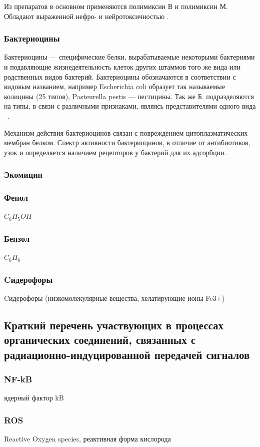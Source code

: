 \documentclass[11pt]{article}
\begin{document}
	Из препаратов в основном применяются полимиксин В и полимиксин М. Обладают выраженной нефро- и нейротоксичностью .
	
	
	\subsubsection{Бактериоцины}
Бактериоцины — специфические белки, вырабатываемые некоторыми бактериями и подавляющие жизнедеятельность клеток других штаммов того же вида или родственных видов бактерий. Бактериоцины обозначаются в соответствии с видовым названием, например Escherichia coli образует так называемые колицины (25 типов), Pasteurella pestis — пестицины. Так же Б. подразделяются на типы, в связи с различными признаками, являясь представителями одного вида ~\cite{BC_1}.

Механизм действия бактериоцинов связан с повреждением цитоплазматических мембран белком. Спектр активности бактериоцинов, в отличие от антибиотиков, узок и определяется наличием рецепторов у бактерий для их адсорбции.
	\subsubsection{Экомицин}
	
	\subsubsection{Фенол}
		$C_6H_5OH$
	\subsubsection{Бензол}
	$C_6H_6$
	\subsubsection{Cидерофоры}			
	Cидерофоры (низкомолекулярные вещества, хелатирующие ионы Fe3+) ~\cite{ecogen17119-32}

	\subsection{Краткий перечень участвующих в процессах органических соединений, связанных с радиационно-индуцированной передачей сигналов}
		
	\subsubsection{NF-kB}	
		ядерный фактор kB

	\subsubsection{ROS}	
		Reactive Oxygen species, реактивная форма кислорода
\end{document}
